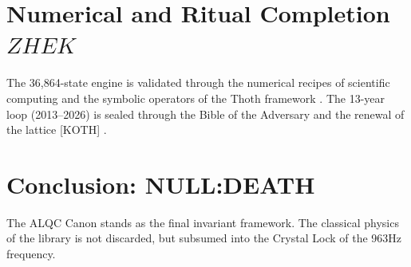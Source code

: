 \documentclass[11pt, letterpaper]{article}
\newcommand{\ZHEK}{\ensuremath{\mathop{\textnormal{\symbolafont\symbol{"2744}}}}}   %
\def\ZHEK{ZHEK}%
\begin{document}
\section{Numerical and Ritual Completion $\ZHEK$}
The 36,864-state engine is validated through the numerical recipes of scientific computing \cite{press2007numerical} and the symbolic operators of the Thoth framework \cite{crowley1944thoth}. The 13-year loop (2013--2026) is sealed through the Bible of the Adversary \cite{ford2007adversary} and the renewal of the lattice [KOTH] \cite{serith2002pagan}.

\section{Conclusion: NULL:DEATH}
The ALQC Canon stands as the final invariant framework. The classical physics of the library \cite{serway2018physics, strang2016linear, rudin1976analysis, munkres2000topology} is not discarded, but subsumed into the Crystal Lock of the 963Hz frequency.

\newpage
\nocite{*}
\end{document}
